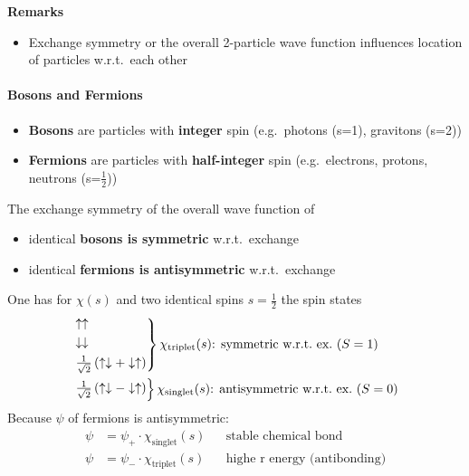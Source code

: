 \textbf{Remarks}
\begin{itemize}
    \item Exchange symmetry or the overall 2-particle wave function influences location of particles w.r.t.\ each other
\end{itemize}

\paragraph{Bosons and Fermions}
\begin{itemize}
    \item \textbf{Bosons} are particles with \textbf{integer} spin (e.g.\ photons (s=1), gravitons (s=2))
    \item \textbf{Fermions} are particles with \textbf{half-integer} spin (e.g.\ electrons, protons, neutrons (s=$\frac{1}{2}$))
\end{itemize}

\newpar{}

The exchange symmetry of the overall wave function of
\begin{itemize}
    \item identical \textbf{bosons is symmetric} w.r.t.\ exchange
    \item identical \textbf{fermions is antisymmetric} w.r.t.\ exchange
\end{itemize}

\newpar{}

One has for $\chi(s)$ and two identical spins $s=\frac{1}{2}$ the spin states
\begin{align*}
     & \begin{rcases}
           \uparrow \uparrow                                                        \\
           \downarrow \downarrow                                                    \\
           \frac{1}{\sqrt{2}}\left(\uparrow \downarrow + \downarrow \uparrow\right) \\
       \end{rcases} \chi_{\mathrm{triplet}}(s)\text{: symmetric w.r.t.\ ex.\ } (S=1) \\
     & \begin{rcases}
           \frac{1}{\sqrt{2}}\left(\uparrow \downarrow - \downarrow \uparrow\right)
       \end{rcases} \chi_{\mathrm{singlet}}(s) \text{: antisymmetric w.r.t.\ ex.\ } (S=0)
\end{align*}
Because $\psi$ of fermions is antisymmetric:
\noindent\begin{align*}
    \psi & = \psi_{+}\cdot \chi_{\mathrm{singlet}}(s) &  & \text{stable chemical bond}        \\
    \psi & = \psi_{-}\cdot \chi_{\mathrm{triplet}}(s) &  & \text{highe r energy (antibonding)}
\end{align*}
 
